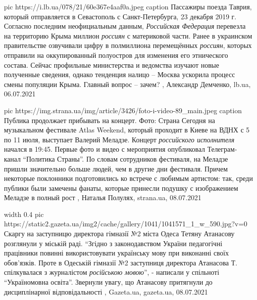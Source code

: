 \ifcmt
  pic https://i.lb.ua/078/21/60e367e4aaf0a.jpeg
	caption Пассажиры поезда Таврия, который отправляется в Севастополь с Санкт-Петербурга, 23 декабря 2019 г.
\fi
Согласно последним неофициальным данным, \emph{Российская Федерация} перевезла на
территорию Крыма миллион \emph{россиян} с материковой части. Ранее в украинском
правительстве озвучивали цифру в полмиллиона перемещённых \emph{россиян}, которых
отправили на оккупированный полуостров для изменения его этнического состава.
Сейчас профильные министерства и ведомства изучают новые полученные сведения,
однако тенденция налицо – Москва ускорила процесс смены популяции Крыма.
Главный вопрос – зачем?
, 
Александр Демченко, lb.ua, 06.07.2021

\ifcmt
  pic https://img.strana.ua/img/article/3426/foto-i-video-89_main.jpeg
	caption Публика продолжает прибывать на концерт. Фото: Страна 
\fi
Сегодня на музыкальном фестивале Atlas Weekend, который проходит в Киеве на
ВДНХ с 5 по 11 июля, выступает Валерий Меладзе. Концерт \emph{российского
исполнителя} начался в 19:45. Первые фото и видео с мероприятия опубликовал
Телеграм-канал \enquote{Политика Страны}. По словам сотрудников фестиваля, на
Меладзе пришли значительно больше людей, чем в другие дни фестиваля. Причем
некоторые поклонники подготовились ко встрече с любимым артистом: так, среди
публики были замечены фанаты, которые принесли подушку с изображением Меладзе в
полный рост
, 
Наталья Полулях, strana.ua, 08.07.2021

\ifcmt
	width 0.4
  pic https://static2.gazeta.ua/img2/cache/gallery/1041/1041571_1_w_590.jpg?v=0
\fi
Скаргу на заступницю директора гімназії №2 міста Одеса Тетяну Атанасову
розглянули у міській раді.  \enquote{Згідно з законодавством України
педагогічні працівники повинні використовувати українську мову при виконанні
своїх обов'язків. Проте в Одеській гімназії №2 заступниця директора Атанасова
Т. спілкувалася з журналістом \emph{російською мовою}}, - написали у спільноті
\enquote{Україномовна освіта}.  Звернули увагу, що Атанасову притягнули до
дисциплінарної відповідальності
, 
Gazeta.ua, gazeta.ua, 08.07.2021

